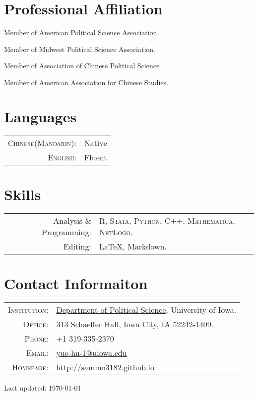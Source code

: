 \documentclass[a4paper,10pt]{article} %
\renewenvironment{itemize}{
	\begin{list}{}{
			\setlength{\leftmargin}{1.5em}
		}
	}{
\end{list}
}
\def\footerlink{}
\begin{document}
\section{Professional Affiliation}
\begin{itemize}
	\item Member of American Political Science Association.
	\item Member of Midwest Political Science Association.
	\item Member of Association of Chinese Political Science
	\item Member of American Association for Chinese Studies.
\end{itemize}


\section{Languages}

\begin{tabular}{rl}
	\textsc{Chinese(Mandarin):} & Native\\
	\textsc{English:} & Fluent
\end{tabular}


\section{Skills}
\begin{tabular}{rl}
	Analysis \& Programming: & R, \textsc{Stata}, \textsc{Python}, \textsc{C++}, \textsc{Mathematica}, \textsc{NetLogo}.\\
	Editing: & {\fb \LaTeX}\setmainfont[SmallCapsFont=Fontin SmallCaps]{Fontin-Regular}, Markdown.
\end{tabular}


\section{Contact Informaiton}
\begin{tabular}{rl}
	\textsc{Institution:} &  \href{http://clas.uiowa.edu/polisci/}{Department of Political Science}, University of Iowa.\\
	\textsc{Office:} & 313 Schaeffer Hall, Iowa City, IA 52242-1409.\\
	\textsc{Phone:} & +1 319-335-2370\\
	\textsc{Email:} & \href{mailto:yue-hu-1@uiowa.edu}{yue-hu-1@uiowa.edu}\\
	\textsc{Homepage:} & \href{http://sammo3182.github.io}{http://sammo3182.github.io}
\end{tabular}

\begin{center}
	\begin{footnotesize}
		Last updated: \today \\
		\href{\footerlink}{\texttt{\footerlink}}
	\end{footnotesize}
\end{center}
\end{document}
